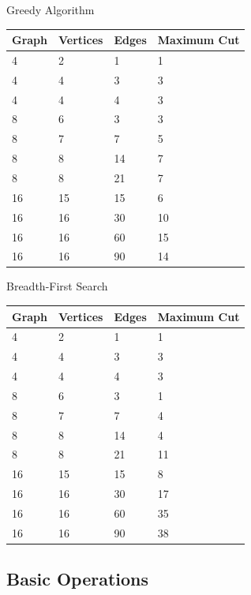 \documentclass[]{revdetua}
\begin{document}
\begin{table}[!ht]
    \centering
    Greedy Algorithm
    \begin{tabular}{|l|l|l|l|}
    \hline
        Graph         & Vertices      & Edges       & Maximum Cut      \\ \hline
        4 & 2 & 1 & 1 \\ \hline
        4 & 4 & 3 & 3 \\ \hline
        4 & 4 & 4 & 3 \\ \hline
        8 & 6 & 3 & 3 \\ \hline
        8 & 7 & 7 & 5 \\ \hline
        8 & 8 & 14 & 7 \\ \hline
        8 & 8 & 21 & 7 \\ \hline
        16 & 15 & 15 & 6 \\ \hline
        16 & 16 & 30 & 10 \\ \hline
        16 & 16 & 60 & 15 \\ \hline
        16 & 16 & 90 & 14 \\ \hline
    \end{tabular}
\end{table}

\begin{table}[!ht]
    \centering
    Breadth-First Search
    \begin{tabular}{|l|l|l|l|}
    \hline
        Graph         & Vertices      & Edges       & Maximum Cut      \\ \hline
        4 & 2 & 1 & 1 \\ \hline
        4 & 4 & 3 & 3 \\ \hline
        4 & 4 & 4 & 3 \\ \hline
        8 & 6 & 3 & 1 \\ \hline
        8 & 7 & 7 & 4 \\ \hline
        8 & 8 & 14 & 4 \\ \hline
        8 & 8 & 21 & 11 \\ \hline
        16 & 15 & 15 & 8 \\ \hline
        16 & 16 & 30 & 17 \\ \hline
        16 & 16 & 60 & 35 \\ \hline
        16 & 16 & 90 & 38 \\ \hline
    \end{tabular}
\end{table}

\subsection{Basic Operations}
\end{document}
